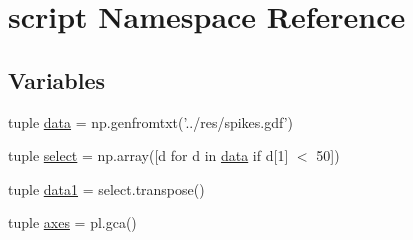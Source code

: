 \hypertarget{namespacescript}{\section{script Namespace Reference}
\label{namespacescript}
}
\subsection*{Variables}
\begin{DoxyCompactItemize}
\item 
tuple \hyperlink{namespacescript_a90bc184d1f00ebc30a749662dc49f24b}{data} = np.\-genfromtxt('../res/spikes.\-gdf')
\item 
tuple \hyperlink{namespacescript_aac11f1a96f0432e03e3d021dc4963841}{select} = np.\-array(\mbox{[}d for d in \hyperlink{namespacescript_a90bc184d1f00ebc30a749662dc49f24b}{data} if d\mbox{[}1\mbox{]} $<$ 50\mbox{]})
\item 
tuple \hyperlink{namespacescript_af71d9ea10b7c4687f80bf6bdaa9fdf06}{data1} = select.\-transpose()
\item 
tuple \hyperlink{namespacescript_a14f6cfd960d8e7b5e7518604e661c3f4}{axes} = pl.\-gca()
\end{DoxyCompactItemize}


